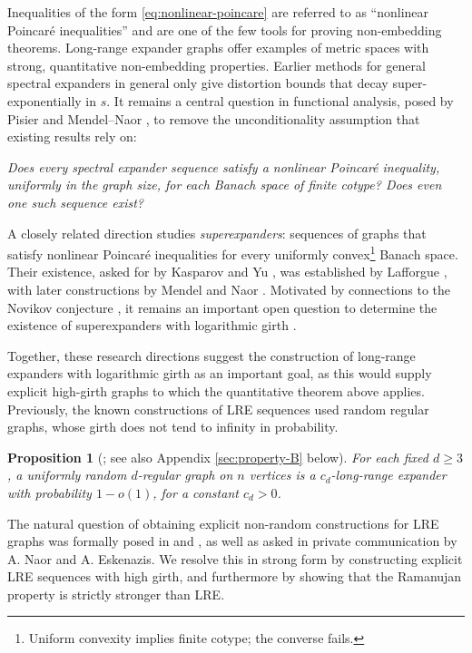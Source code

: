 \documentclass[11pt,reqno]{amsart}
\newtheorem{proposition}[theorem]{Proposition}
\theoremstyle{definition}
\begin{document}
Inequalities of the form \eqref{eq:nonlinear-poincare} are referred to as ``nonlinear Poincar\'e inequalities'' and are one of the few tools for proving non-embedding theorems. Long-range expander graphs offer examples of metric spaces with strong, quantitative non-embedding properties. Earlier methods for general
spectral expanders \cite{Oz04,OS94,Na14} in general only give distortion bounds that decay super-exponentially in $s$. It remains a central question in functional analysis, posed by Pisier and Mendel--Naor \cite{Pi10,MN}, to remove the unconditionality
assumption that existing results rely on:
\begin{center}
\em Does every spectral expander sequence satisfy a nonlinear
Poincar\'e inequality, uniformly in the graph size, for each Banach
space of finite cotype? Does even one such sequence exist?
\end{center}

A closely related direction studies \textit{superexpanders}: sequences of graphs that satisfy nonlinear Poincar\'e inequalities for every uniformly convex\footnote{Uniform convexity implies finite cotype; the converse fails.} Banach space. Their existence, asked for by Kasparov and Yu \cite{KY06}, was established by Lafforgue \cite{La08}, with later constructions by Mendel and Naor \cite{MN}. Motivated by connections to the Novikov conjecture \cite{KY06,MN}, it remains an important open question to determine the existence of superexpanders with logarithmic girth \cite[Section~1.1]{MN}.

Together, these research directions suggest the construction of long-range expanders with logarithmic
girth as an important goal, as this would supply explicit high-girth graphs to which the quantitative theorem above applies. Previously, the known constructions of LRE sequences used random regular graphs, whose girth does not tend to infinity in probability. 

\begin{proposition}[\cite{ADTT}; see also Appendix \ref{sec:property-B} below]
For each fixed $d\ge3$, a uniformly random $d$-regular graph
on $n$ vertices is a $c_d$-long-range expander with probability
$1-o(1)$, for a constant $c_d>0$.
\end{proposition}


The natural question of obtaining explicit non-random constructions for LRE graphs was formally posed in \cite{ADTT} and \cite{ADTTUniversal}, as well as asked in private communication by A. Naor and A. Eskenazis. We resolve this in strong form by constructing explicit LRE sequences with high girth, and furthermore by showing that the Ramanujan property is strictly stronger than LRE. 
\end{document}
